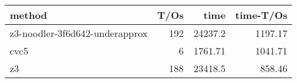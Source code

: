 \begin{tabular}{lrrr}
\hline
 method                         &   T/Os &     time &   time-T/Os \\
\hline
 z3-noodler-3f6d642-underapprox &    192 & 24237.2  &     1197.17 \\
 cvc5                           &      6 &  1761.71 &     1041.71 \\
 z3                             &    188 & 23418.5  &      858.46 \\
\hline
\end{tabular}
